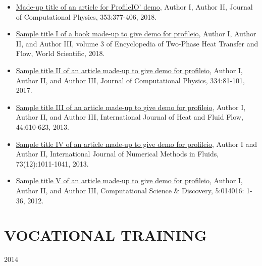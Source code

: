 \documentclass{res}
\begin{document}
\begin{resume}
\begin{itemize}[leftmargin=\parindent]
	\item[] \href{https://www.sciencedirect.com/science/article/pii/S0021999117307696}{Made-up title of an article for ProfileIO' demo}, Author I, Author II, Journal of Computational Physics, 353:377-406, 2018.
	\item[] \href{https://www.worldscientific.com/doi/abs/10.1142/9789813229440_0008}{Sample title I of a book made-up to give demo for profileio}, Author I, Author II, and Author III, volume 3 of Encyclopedia of Two-Phase Heat Transfer and Flow, World Scientific, 2018.
	\item[] \href{https://www.sciencedirect.com/science/article/pii/S0021999116307045}{Sample title II of an article made-up to give demo for profileio}, Author I, Author II, and Author III, Journal of Computational Physics, 334:81-101, 2017.
	\item[] \href{https://www.sciencedirect.com/science/article/pii/S0142727X13001707}{Sample title III of an article made-up to give demo for profileio}, Author I, Author II, and Author III, International Journal of Heat and Fluid Flow, 44:610-623, 2013.
	\item[] \href{http://onlinelibrary.wiley.com/doi/10.1002/fld.3834/abstract}{Sample title IV of an article made-up to give demo for profileio}, Author I and Author II, International Journal of Numerical Methods in Fluids, 73(12):1011-1041, 2013.
	\item[] \href{http://iopscience.iop.org/1749-4699/5/1/014016}{Sample title V of an article made-up to give demo for profileio}, Author I, Author II, and Author III, Computational Science \& Discovery, 5:014016: 1-36, 2012.
	\end{itemize}
	
	
	
	\section{\MakeUppercase{Vocational Training}} \vskip 0.15in
	
	\hspace*{-0.25in}{\bf Trainee} \hfill 2014 \\
	\hspace*{-0.25in}{\it Animation Studios}
	\begin{itemize}[leftmargin=\parindent]
	\setlength{\itemsep}{0mm} \smallskip
	

\end{itemize}
\end{resume}
\end{document}
